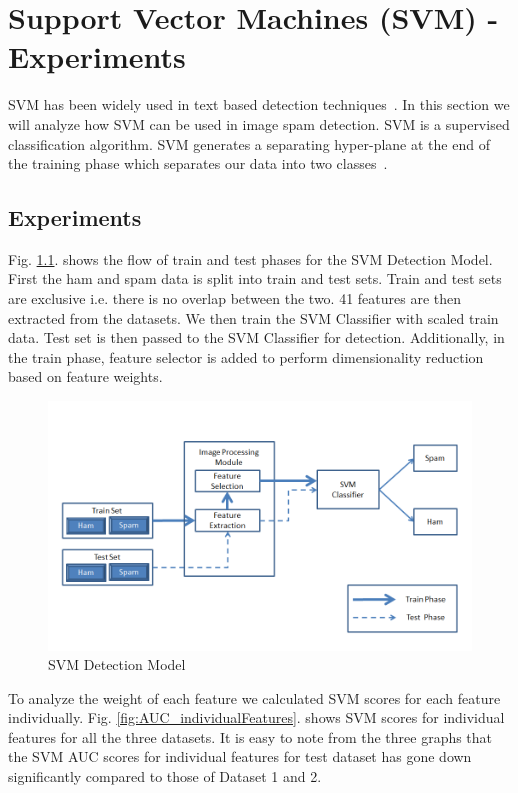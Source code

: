 \chapter{Support Vector Machines (SVM) - Experiments}

\par SVM has been widely used in text based detection techniques~\cite{1}. In this section we will analyze how SVM can be used in image spam detection. SVM is a supervised classification algorithm. SVM generates a separating hyper-plane at the end of the training phase which separates our data into two classes~\cite{8}. 



\section{Experiments}
\par Fig. \ref{fig:svm_detection_model}. shows the flow of train and test phases for the SVM Detection Model. First the ham and spam data is split into train and test sets. Train and test sets are exclusive i.e. there is no overlap between the two. 41 features are then extracted from the datasets. We then train the SVM Classifier with scaled train data. Test set is then passed to the SVM Classifier for detection. Additionally, in the train phase, feature selector is added to perform dimensionality reduction based on feature weights. 

\begin{figure}[h]
	\centering
	\includegraphics[width=.9\textwidth]{images/svm-flow.PNG}
	\caption{SVM Detection Model}
	\label{fig:svm_detection_model}
\end{figure}

\par To analyze the weight of each feature we calculated SVM scores for each feature individually. Fig. \ref{fig:AUC_individualFeatures}. shows SVM scores for individual features for all the three datasets. It is easy to note from the three graphs that the SVM AUC scores for individual features for test dataset has gone down significantly compared to those of Dataset 1 and 2.


